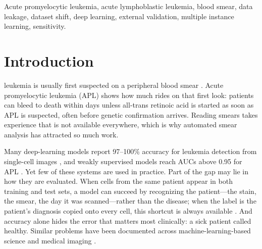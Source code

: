 \documentclass[journal]{IEEEtran}
\begin{document}
\begin{IEEEkeywords}
Acute promyelocytic leukemia, acute lymphoblastic leukemia, blood smear, data leakage, dataset shift, deep learning, external validation, multiple instance learning, sensitivity.
\end{IEEEkeywords}

\section{Introduction}
 leukemia is usually first suspected on a peripheral blood smear \cite{khoury2022who}. Acute promyelocytic leukemia (APL) shows how much rides on that first look: patients can bleed to death within days unless all-trans retinoic acid is started as soon as APL is suspected, often before genetic confirmation arrives. Reading smears takes experience that is not available everywhere, which is why automated smear analysis has attracted so much work.

Many deep-learning models report 97--100\% accuracy for leukemia detection from single-cell images \cite{jammal2025causalformer,jammal2025neurobridge}, and weakly supervised models reach AUCs above 0.95 for APL \cite{manescu2023apl,eckardt2022apl}. Yet few of these systems are used in practice. Part of the gap may lie in how they are evaluated. When cells from the same patient appear in both training and test sets, a model can succeed by recognizing the patient---the stain, the smear, the day it was scanned---rather than the disease; when the label is the patient's diagnosis copied onto every cell, this shortcut is always available \cite{geirhos2020shortcut,degrave2021shortcuts}. And accuracy alone hides the error that matters most clinically: a sick patient called healthy. Similar problems have been documented across machine-learning-based science \cite{kapoor2023leakage} and medical imaging \cite{zech2018confounding,roberts2021pitfalls,varoquaux2022failures}.
\end{document}
